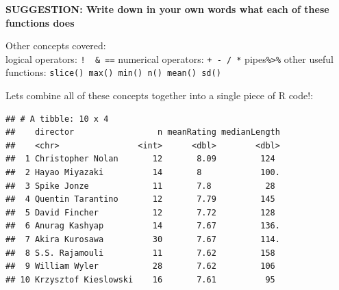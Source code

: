 \documentclass[]{book}
\newenvironment{Shaded}{\begin{snugshade}}{\end{snugshade}}
\newcommand{\DataTypeTok}[1]{\textcolor[rgb]{0.13,0.29,0.53}{#1}}
\newcommand{\DecValTok}[1]{\textcolor[rgb]{0.00,0.00,0.81}{#1}}
\newcommand{\KeywordTok}[1]{\textcolor[rgb]{0.13,0.29,0.53}{\textbf{#1}}}
\newcommand{\NormalTok}[1]{#1}
\newcommand{\OperatorTok}[1]{\textcolor[rgb]{0.81,0.36,0.00}{\textbf{#1}}}
\newcommand{\StringTok}[1]{\textcolor[rgb]{0.31,0.60,0.02}{#1}}
\begin{document}
\textbf{SUGGESTION: Write down in your own words what each of these functions does}

Other concepts covered:\\
logical operators: \texttt{!\ \textbar{}\ \&\ ==}
numerical operators: \texttt{+\ -\ /\ *}
pipes\texttt{\%\textgreater{}\%}
other useful functions: \texttt{slice()\ max()\ min()\ n()\ mean()\ sd()}

Lets combine all of these concepts together into a single piece of R code!:

\begin{Shaded}
\end{Shaded}

\begin{verbatim}
## # A tibble: 10 x 4
##    director                 n meanRating medianLength
##    <chr>                <int>      <dbl>        <dbl>
##  1 Christopher Nolan       12       8.09         124 
##  2 Hayao Miyazaki          14       8            100.
##  3 Spike Jonze             11       7.8           28 
##  4 Quentin Tarantino       12       7.79         145 
##  5 David Fincher           12       7.72         128 
##  6 Anurag Kashyap          14       7.67         136.
##  7 Akira Kurosawa          30       7.67         114.
##  8 S.S. Rajamouli          11       7.62         158 
##  9 William Wyler           28       7.62         106 
## 10 Krzysztof Kieslowski    16       7.61          95
\end{verbatim}
\end{document}
